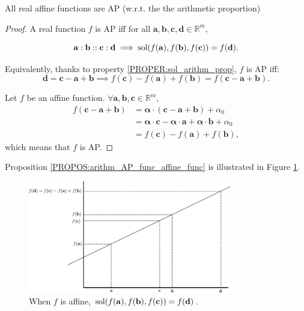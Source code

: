\begin{proposition}
  \label{PROPOS:arithm_AP_func_affine_func}
  All real affine functions are AP (w.r.t. the the arithmetic proportion)
\end{proposition}
\begin{proof}
  A real function $f$ is AP iff for all $\mathbf{a}, \mathbf{b}, \mathbf{c},
  \mathbf{d} \in \mathbb{R}^m$,

  $$\mathbf{a}: \mathbf{b}:: \mathbf{c}: \mathbf{d} \implies
  \text{sol}(f(\mathbf{a}), f(\mathbf{b}), f(\mathbf{c})) = f(\mathbf{d}).$$

  Equivalently, thanks to property \ref{PROPER:sol_arithm_prop},  $f$ is AP
  iff: $$\mathbf{d} = \mathbf{c} - \mathbf{a} + \mathbf{b} \implies
  f(\mathbf{c}) - f(\mathbf{a}) +  f(\mathbf{b}) = f( \mathbf{c} - \mathbf{a} +
  \mathbf{b}).$$

  Let $f$ be an affine function.
  $\forall \mathbf{a}, \mathbf{b}, \mathbf{c} \in \mathbb{R}^m$,
  \begin{align*}
    f(\mathbf{c} - \mathbf{a} + \mathbf{b}) &= \boldsymbol{\alpha} \cdot (\mathbf{c}
    - \mathbf{a} + \mathbf{b}) + \alpha_0\\
    &= \boldsymbol{\alpha} \cdot \mathbf{c} - \boldsymbol{\alpha} \cdot
    \mathbf{a} + \boldsymbol{\alpha} \cdot \mathbf{b} + \alpha_0\\
    &= f(\mathbf{c}) - f(\mathbf{a}) + f(\mathbf{b}),
  \end{align*}
  which means that $f$ is AP.
\end{proof}

Proposition \ref{PROPOS:arithm_AP_func_affine_func} is illustrated in Figure
\ref{FIG:real_AP_func}.
\begin{figure}[!h]
\centering
  \includegraphics[width=3.5in]{figures/real_AP_fuction.pdf}
  \caption{When $f$ is affine, $\text{sol}(f(\mathbf{a}), f(\mathbf{b}),
  f(\mathbf{c})) = f(\mathbf{d})$.}
\label{FIG:real_AP_func}
\end{figure}

